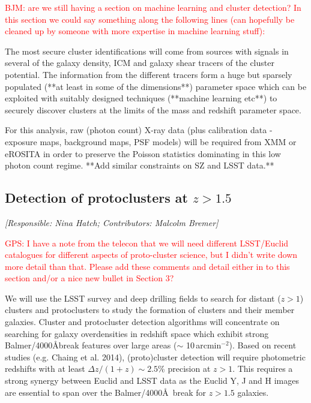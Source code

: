 \documentclass[a4paper,11pt]{article}
\newcommand{\red}{\textcolor{red}}
\begin{document}
\red{BJM: are we still having a section on machine learning and
  cluster detection? In this section we could say something along the
  following lines (can hopefully be cleaned up by someone with more
  expertise in machine learning stuff):}

The most secure cluster identifications will come from sources with
signals in several of the galaxy density, ICM and galaxy shear tracers
of the cluster potential. The information from the different tracers
form a huge but sparsely populated (**at least in some of the
dimensions**) parameter space which can be exploited with suitably
designed techniques (**machine learning etc**) to securely discover
clusters at the limits of the mass and redshift parameter space.

For this analysis, raw (photon count) X-ray data (plus calibration
data - exposure maps, background maps, PSF models) will be required
from XMM or eROSITA in order to preserve the Poisson statistics
dominating in this low photon count regime. **Add similar constraints
on SZ and LSST data.**

\subsection{Detection of protoclusters at $z>1.5$}\label{sec:proto}

{\it [Responsible: Nina Hatch; Contributors: Malcolm Bremer]}

\noindent\red{GPS: I have a note from the telecon that we will need
  different LSST/Euclid catalogues for different aspects of
  proto-cluster science, but I didn't write down more detail than
  that.  Please add these comments and detail either in to this
  section and/or a nice new bullet in Section 3?}

\noindent We will use the LSST survey and deep drilling fields to
search for distant ($z >1$) clusters and protoclusters to study the
formation of clusters and their member galaxies. Cluster and
protocluster detection algorithms will concentrate on searching for
galaxy overdensities in redshift space which exhibit strong
Balmer/4000\AA break features over large areas ($\sim$
10\,arcmin$^{-2}$). Based on recent studies (e.g. Chaing et al. 2014),
(proto)cluster detection will require photometric redshifts with at
least $\Delta z/ (1+z)\sim2.5$\% precision at $z>1$. This requires a
strong synergy between Euclid and LSST data as the Euclid Y, J and H
images are essential to span over the Balmer/4000\AA\ break for
$z>1.5$ galaxies.
\end{document}
